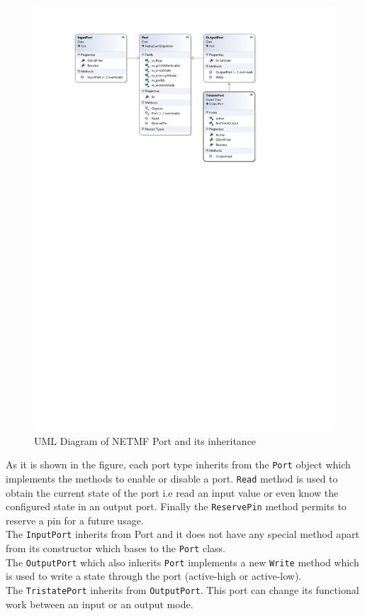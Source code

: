 \begin{figure}[H]\begin{center}
 \centering
  \captionsetup{justification=centering}
  \includegraphics[width=1\textwidth]{pictures/iosharp/gpio}
  \caption{UML Diagram of NETMF Port and its inheritance \label{fig:gpio-uml}}
\end{center}\end{figure}

As it is shown in the figure, each port type inherits from the \verb!Port! object which implements the methods to enable or disable a port. \verb!Read! method is used to obtain the current state of the port i.e read an input value or even know the configured state in an output port. Finally the \verb!ReservePin! method permits to reserve a pin for a future usage.
\\
The \verb!InputPort! inherits from Port and it does not have any special method apart from its constructor which bases to the \verb!Port! class. 
\\
The \verb!OutputPort! which also inherits \verb!Port! implements a new \verb!Write! method which is used to write a state through the port (active-high or active-low).
\\
The \verb!TristatePort! inherits from \verb!OutputPort!. This port can change its functional work between an input or an output mode.

